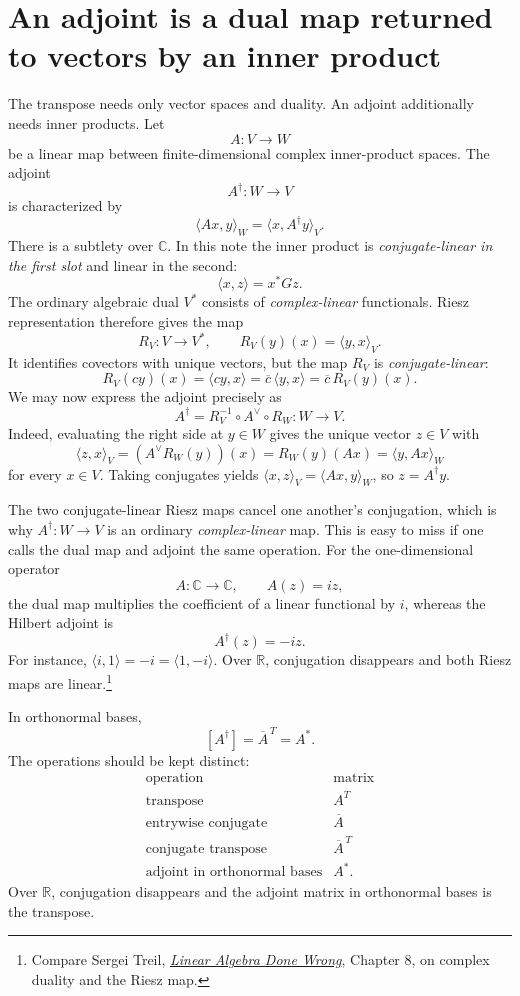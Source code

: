 \section{An adjoint is a dual map returned to vectors by an inner product}

The transpose needs only vector spaces and duality.  An adjoint additionally needs inner products.  Let
\[
  A:V\to W
\]
be a linear map between finite-dimensional complex inner-product spaces.  The adjoint
\[
  A^\dagger:W\to V
\]
is characterized by
\[
  \langle Ax,y\rangle_W
  =\langle x,A^\dagger y\rangle_V.
\]
There is a subtlety over $\mathbb C$. In this note the inner product is \emph{conjugate-linear in the first slot} and linear in the second:
\[
 \langle x,z\rangle=x^*Gz.
\]
The ordinary algebraic dual $V^*$ consists of \emph{complex-linear} functionals. Riesz representation therefore gives the map
\[
 R_V:V\longrightarrow V^*,
 \qquad R_V(y)(x)=\langle y,x\rangle_V.
\]
It identifies covectors with unique vectors, but the map $R_V$ is \emph{conjugate-linear}:
\[
 R_V(cy)(x)=\langle cy,x\rangle
 =\overline c\,\langle y,x\rangle
 =\overline c\,R_V(y)(x).
\]
We may now express the adjoint precisely as
\[
 \boxed{A^\dagger=R_V^{-1}\circ A^\vee\circ R_W:
 W\longrightarrow V.}
\]
Indeed, evaluating the right side at $y\in W$ gives the unique vector $z\in V$ with
\[
 \langle z,x\rangle_V
 =(A^\vee R_W(y))(x)
 =R_W(y)(Ax)
 =\langle y,Ax\rangle_W
\]
for every $x\in V$. Taking conjugates yields
$\langle x,z\rangle_V=\langle Ax,y\rangle_W$,
so $z=A^\dagger y$.

The two conjugate-linear Riesz maps cancel one another's conjugation, which is why $A^\dagger:W\to V$ is an ordinary \emph{complex-linear} map. This is easy to miss if one calls the dual map and adjoint the same operation. For the one-dimensional operator
\[
 A:\mathbb C\to\mathbb C,\qquad A(z)=iz,
\]
the dual map multiplies the coefficient of a linear functional by $i$, whereas the Hilbert adjoint is
\[
 \boxed{A^\dagger(z)=-iz.}
\]
For instance, $\langle i,1\rangle=-i=\langle1,-i\rangle$. Over $\mathbb R$, conjugation disappears and both Riesz maps are linear.\footnote{Compare Sergei Treil, \href{https://www.math.brown.edu/streil/papers/LADW/HTML_2026_08-31/Ch8.html}{\emph{Linear Algebra Done Wrong}}, Chapter 8, on complex duality and the Riesz map.}

In orthonormal bases,
\[
  [A^\dagger]=\overline A^{\,T}=A^*.
\]
The operations should be kept distinct:
\[
\begin{array}{c|c}
\text{operation}&\text{matrix}\\ \hline
\text{transpose}&A^T\\
\text{entrywise conjugate}&\overline A\\
\text{conjugate transpose}&\overline A^{\,T}\\
\text{adjoint in orthonormal bases}&A^*.
\end{array}
\]
Over \(\mathbb R\), conjugation disappears and the adjoint matrix in orthonormal bases is the transpose.

